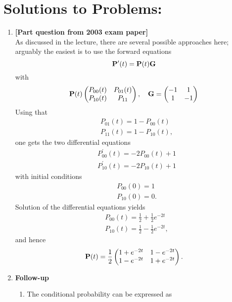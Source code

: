 \documentclass[11pt,a4paper]{article}
\begin{document}
  \section*{Solutions to Problems:}
  \begin{enumerate}
    \item \textbf{[Part question from 2003 exam paper]}\\
    As discussed in the lecture, there are several possible approaches here; arguably the easiest is to use the forward equations
    $$
    \vb{P}^\prime(t) = \vb{P}(t)\vb{G}
    $$
    with
    $$
    \vb{P}(t)
    \begin{pmatrix}
      P_{00}(t) & P_{01}(t)\\
      P_{10}(t) & P_{11}
    \end{pmatrix},\quad
    \vb{G} =
    \begin{pmatrix}
      -1 & 1\\
      1 & -1
    \end{pmatrix}
    $$
    Using that
    \begin{align*}
      &P_{01}(t) = 1 - P_{00}(t)\\
      &P_{11}(t) = 1 - P_{10}(t),
    \end{align*}
    one gets the two differential equations
    \begin{align*}
      &P^\prime_{00}(t) = -2P_{00}(t) + 1\\
      &P^\prime_{10}(t) = -2P_{10}(t) + 1
    \end{align*}
    with initial conditions
    \begin{align*}
      &P_{00}(0) = 1\\
      &P_{10}(0) = 0.
    \end{align*}
    Solution of the differential equations yields
    \begin{align*}
      &P_{00}(t) = \frac{1}{2} + \frac{1}{2}e^{-2t}\\
      &P_{10}(t) = \frac{1}{2} - \frac{1}{2}e^{-2t},
    \end{align*}
    and hence
    $$
    \vb{P}(t) = \frac{1}{2}
    \begin{pmatrix}
      1 + e^{-2t} & 1- e^{-2t}\\
      1 - e^{-2t} & 1 + e^{-2t}
    \end{pmatrix}.
    $$
    \item \textbf{Follow-up}
    \begin{enumerate}
      \item The conditional probability can be expressed as

\end{enumerate}
\end{enumerate}
\end{document}
